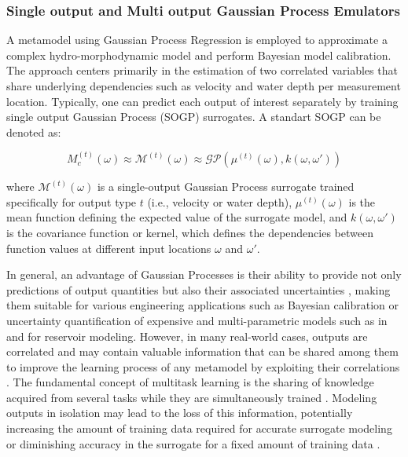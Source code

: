 \documentclass[draft,linenumbers,onecolumn]{agujournal2019} %
\begin{document}
\subsubsection{Single output and Multi output Gaussian Process Emulators}


A metamodel using Gaussian Process Regression is employed to approximate a complex hydro-morphodynamic model and perform Bayesian model calibration. The approach centers primarily in the estimation of two correlated variables that share underlying dependencies such as velocity and water depth per measurement location. Typically, one can predict each output of interest separately by training single output Gaussian Process (SOGP) surrogates. A standart SOGP can be denoted as:

\[
M_c^{(t)}(\omega) \approx \mathcal{M}^{(t)}(\omega) \approx \mathcal{GP}(\mu^{(t)}(\omega), k(\omega, \omega'))
\]

where \( \mathcal{M}^{(t)}(\omega) \) is a single-output Gaussian Process surrogate trained specifically for output type \( t \) (i.e., velocity or water depth), \( \mu^{(t)}(\omega) \) is the mean function defining the expected value of the surrogate model, and \( k(\omega, \omega') \) is the covariance function or kernel, which defines the dependencies between function values at different input locations \( \omega \) and \( \omega' \). 

In general, an advantage of Gaussian Processes is their ability to provide not only predictions of output quantities but also their associated uncertainties \cite{lindholm2022machine}, making them suitable for various engineering applications such as Bayesian calibration or uncertainty quantification of expensive and multi-parametric models such as in  and \cite{mouris2023stability} for reservoir modeling. However, in many real-world cases, outputs are correlated and may contain valuable information that can be shared among them to improve the learning process of any metamodel by exploiting their correlations \cite{breiman1997predicting}. The fundamental concept of multitask learning is the sharing of knowledge acquired from several tasks while they are simultaneously trained \cite{caruana1997multitask}. Modeling outputs in isolation may lead to the loss of this information, potentially increasing the amount of training data required for accurate surrogate modeling or diminishing accuracy in the surrogate for a fixed amount of training data \cite{liu2018remarks}.
\end{document}
